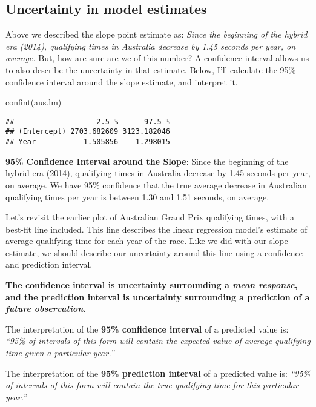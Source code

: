 \documentclass[
]{book}
\newenvironment{Shaded}{\begin{snugshade}}{\end{snugshade}}
\newcommand{\FunctionTok}[1]{\textcolor[rgb]{0.00,0.00,0.00}{#1}}
\newcommand{\NormalTok}[1]{#1}
\begin{document}
\hypertarget{uncertainty-in-model-estimates}{%
\subsection{Uncertainty in model estimates}\label{uncertainty-in-model-estimates}}

Above we described the slope point estimate as: \emph{Since the beginning of the hybrid era (2014), qualifying times in Australia decrease by 1.45 seconds per year, on average.} But, how are sure are we of this number? A confidence interval allows us to also describe the uncertainty in that estimate. Below, I'll calculate the 95\% confidence interval around the slope estimate, and interpret it.

\begin{Shaded}
\begin{Highlighting}[]
\FunctionTok{confint}\NormalTok{(aus.lm)}
\end{Highlighting}
\end{Shaded}

\begin{verbatim}
##                   2.5 %      97.5 %
## (Intercept) 2703.682609 3123.182046
## Year          -1.505856   -1.298015
\end{verbatim}

\textbf{95\% Confidence Interval around the Slope}: Since the beginning of the hybrid era (2014), qualifying times in Australia decrease by 1.45 seconds per year, on average. We have 95\% confidence that the true average decrease in Australian qualifying times per year is between 1.30 and 1.51 seconds, on average.

Let's revisit the earlier plot of Australian Grand Prix qualifying times, with a best-fit line included. This line describes the linear regression model's estimate of average qualifying time for each year of the race. Like we did with our slope estimate, we should describe our uncertainty around this line using a confidence and prediction interval.

\textbf{The confidence interval is uncertainty surrounding a \emph{mean response}, and the prediction interval is uncertainty surrounding a prediction of a \emph{future observation}.}

The interpretation of the \textbf{95\% confidence interval} of a predicted value is: \emph{``95\% of intervals of this form will contain the expected value of average qualifying time given a particular year.''}

The interpretation of the \textbf{95\% prediction interval} of a predicted value is: \emph{``95\% of intervals of this form will contain the true qualifying time for this particular year.''}
\end{document}
